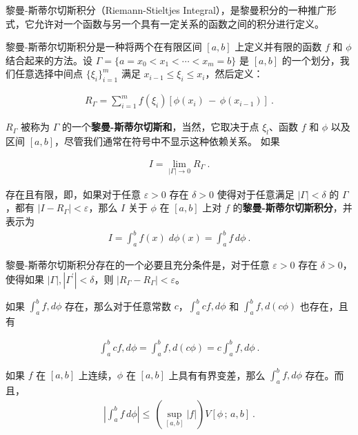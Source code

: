 
黎曼-斯蒂尔切斯积分（Riemann-Stieltjes Integral），是黎曼积分的一种推广形式，它允许对一个函数与另一个具有一定关系的函数之间的积分进行定义。

黎曼-斯蒂尔切斯积分是一种将两个在有限区间 $ [a, b] $ 上定义并有限的函数 $ f $ 和 $ \phi $ 结合起来的方法。设 $ \Gamma=\{a=x_{0}<x_{1}<\cdots<x_{m}=b\} $ 是 $ [a, b] $ 的一个划分，我们任意选择中间点 $ \{\xi_{i}\}_{i=1}^{m} $ 满足 $ x_{i-1}\leq\xi_{i}\leq x_{i} $，然后定义：

\begin{align}
R_{\Gamma}=\sum_{i=1}^{m}f(\xi_{i})[\phi(x_{i})\,-\,\phi(x_{i-1})]~.
\end{align}

$ R_{\Gamma} $ 被称为 $ \Gamma $ 的一个\textbf{黎曼-斯蒂尔切斯和}，当然，它取决于点 $ \xi_{l} $、函数 $ f $ 和 $ \phi $ 以及区间 $ [a, b] $，尽管我们通常在符号中不显示这种依赖关系。
如果

\begin{align}
I=\lim_{|\Gamma|\to0}R_{\Gamma}~.
\end{align}

存在且有限，即，如果对于任意 $ \varepsilon>0 $ 存在 $ \delta>0 $ 使得对于任意满足 $ |\Gamma|<\delta $ 的 $ \Gamma $，都有 $ |I-R_{\Gamma}|<\varepsilon $，那么 $ I $ 关于 $ \phi $ 在 $ [a, b] $ 上对 $ f $ 的\textbf{黎曼-斯蒂尔切斯积分}，并表示为
\begin{align}
I=\int_{a}^{b}\!f(x)\;d\phi(x)=\int_{a}^{b}\!f\,d\phi~.
\end{align}

黎曼-斯蒂尔切斯积分存在的一个必要且充分条件是，对于任意 $ \varepsilon>0 $ 存在 $ \delta>0 $，使得如果 $ |\Gamma|,|\Gamma^{\prime}|<\delta $，则 $ |R_{\Gamma}-R_{\Gamma}|<\varepsilon $。

\begin{theorem}{}
如果 $\int_{a}^{b}f,d\phi$ 存在，那么对于任意常数 $c$，$\int_{a}^{b}cf,d\phi$ 和 $\int_{a}^{b}f,d(c\phi)$ 也存在，且有

\begin{align} \int_{a}^{b}cf,d\phi=\int_{a}^{b}f,d(c\phi)=c\int_{a}^{b}f,d\phi~. \end{align}
\end{theorem}


\begin{theorem}{}
如果 $f$ 在 $[a,b]$ 上连续，$\phi$ 在 $[a,b]$ 上具有有界变差，那么 $ \int_{a}^{b}f,d\phi$ 存在。而且，
\begin{align}
  \left|\int_{a}^{b}f\,d\phi\right|\leq\,(\sup_{[a,b]}|f|)V[\phi\,;\,a,b]~.
\end{align}

\end{theorem}

